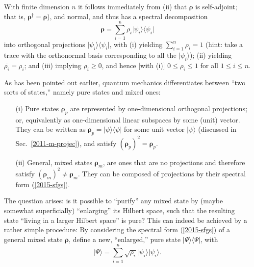 With finite dimension $n$ it follows immediately from (ii)
that $\boldsymbol{\rho}$ is self-adjoint; that is,
${\boldsymbol{\rho}}^\dagger ={\boldsymbol{\rho}}$), and normal, and thus has a spectral decomposition
\begin{equation}
\boldsymbol{\rho} =\sum_{i=1}^n \rho_i \vert \psi_i\rangle \langle \psi_i \vert
\label{2015-sfgs}
\end{equation}
into orthogonal projections $\vert \psi_i\rangle \langle \psi_i \vert$,
with
(i) yielding $\sum_{i=1}^n\rho_i =1$
(hint: take a trace with the orthonormal basis corresponding to all the $\vert \psi_i\rangle$);
(ii) yielding  $\overline{\rho_i}=\rho_i$;
and (iii) implying $\rho_i \ge 0$, and hence [with (i)] $0 \le \rho_i \le 1$
for all $1\le i \le n$.


As has been pointed out earlier, quantum mechanics differentiates between ``two sorts of states,'' namely
pure states and mixed ones:
\begin{itemize}
\item[(i)]
Pure states ${\boldsymbol{\rho}}_p$  are
represented by one-dimensional orthogonal projections; or, equivalently as one-dimensional linear subspaces by some (unit) vector.
They can be written as ${\boldsymbol{\rho}}_p =  \vert \psi \rangle \langle \psi  \vert$ for some unit vector $\vert \psi \rangle$
(discussed in Sec.~\ref{2011-m-projec}), and
satisfy $({\boldsymbol{\rho}}_p)^2={\boldsymbol{\rho}}_p$.
\item[(ii)]
General, mixed states ${\boldsymbol{\rho}}_m$, are ones that are no projections and therefore
satisfy $({\boldsymbol{\rho}}_m)^2 \neq {\boldsymbol{\rho}}_m$.
They can be composed of projections by their spectral form (\ref{2015-sfgs}).
\end{itemize}

The question arises: is it possible to ``purify'' any mixed state by (maybe somewhat superficially) ``enlarging'' its
Hilbert space, such that the resulting state ``living in a larger Hilbert space'' is pure?
This can indeed be achieved by a rather simple procedure:
By considering the spectral form (\ref{2015-sfgs}) of a general mixed state ${\boldsymbol{\rho}}$,
define a new, ``enlarged,'' pure state  $\vert \Psi\rangle \langle \Psi \vert$, with
\begin{equation}
\vert \Psi\rangle = \sum_{i=1}^n \sqrt{\rho_i}  \vert \psi_i\rangle  \vert \psi_i\rangle
.
\label{2015-puran}
\end{equation}

